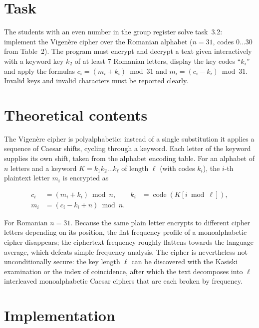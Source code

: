\documentclass[12pt,a4paper]{article}
\begin{document}
\setcounter{page}{2}
\tableofcontents
\newpage

\section{Task}

The students with an even number in the group register solve task~3.2: implement the Vigen\`ere cipher over the Romanian alphabet ($n=31$, codes $0\ldots30$ from Table~2). The program must encrypt and decrypt a text given interactively with a keyword key $k_2$ of at least 7 Romanian letters, display the key codes ``$k_i$'' and apply the formulas $c_i=(m_i+k_i)\bmod 31$ and $m_i=(c_i-k_i)\bmod 31$. Invalid keys and invalid characters must be reported clearly.

\section{Theoretical contents}

The Vigen\`ere cipher is polyalphabetic: instead of a single substitution it applies a sequence of Caesar shifts, cycling through a keyword. Each letter of the keyword supplies its own shift, taken from the alphabet encoding table. For an alphabet of $n$ letters and a keyword $K=k_1k_2\ldots k_\ell$ of length $\ell$ (with codes $k_i$), the $i$-th plaintext letter $m_i$ is encrypted as

\begin{align*}
  c_i &= (m_i+k_i)\bmod n, & k_i &= \operatorname{code}(K[i\bmod \ell]),\\
  m_i &= (c_i-k_i+n)\bmod n.
\end{align*}

For Romanian $n=31$. Because the same plain letter encrypts to different cipher letters depending on its position, the flat frequency profile of a monoalphabetic cipher disappears; the ciphertext frequency roughly flattens towards the language average, which defeats simple frequency analysis. The cipher is nevertheless not unconditionally secure: the key length $\ell$ can be discovered with the Kasiski examination or the index of coincidence, after which the text decomposes into $\ell$ interleaved monoalphabetic Caesar ciphers that are each broken by frequency.

\section{Implementation}
\end{document}
